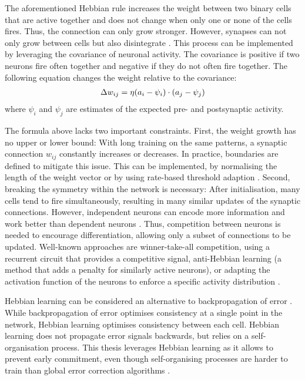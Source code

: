 The aforementioned Hebbian rule increases the weight between two binary cells that are active together and does not change when only one or none of the cells fires. Thus, the connection can only grow stronger.
However, synapses can not only grow between cells but also disintegrate .
This process can be implemented by leveraging the covariance of neuronal activity.
The covariance is positive if two neurons fire often together and negative if they do not often fire together.
The following equation changes the weight relative to the covariance:
%
\begin{align}\eqlbl{hebb_2}
	\Delta w_{ij} = \eta (a_i - \psi_i) \cdot (a_j - \psi_j)
\end{align}
%
where \(\psi_i\) and \(\psi_j\) are estimates of the expected pre- and postsynaptic activity.

The formula above lacks two important constraints.
First, the weight growth has no upper or lower bound: With long training on the same patterns, a synaptic connection $w_{ij}$ constantly increases or decreases. In practice, boundaries are defined to mitigate this issue. This can be implemented, by normalising the length of the weight vector  or by using rate-based threshold adaption .
Second, breaking the symmetry within the network is necessary: After initialisation, many cells tend to fire simultaneously, resulting in many similar updates of the synaptic connections. However, independent neurons can encode more information and work better than dependent neurons .
Thus, competition between neurons is needed to encourage differentiation, allowing only a subset of connections to be updated.
Well-known approaches are winner-take-all competition, using a recurrent circuit that provides a competitive signal, anti-Hebbian learning  (a method that adds a penalty for similarly active neurons), or adapting the activation function of the neurons to enforce a specific activity distribution .

Hebbian learning can be considered an alternative to backpropagation of error .
While backpropagation of error optimises consistency at a single point in the network, Hebbian learning optimises consistency between each cell.
Hebbian learning does not propagate error signals backwards, but relies on a self-organisation process.
This thesis leverages Hebbian learning as it allows to prevent early commitment, even though self-organising processes are harder to train than global error correction algorithms .


